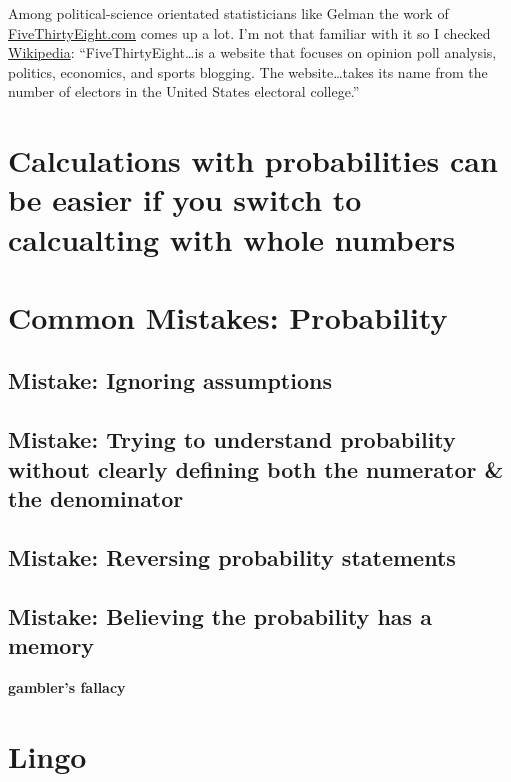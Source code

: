\documentclass[]{book}
\theoremstyle{definition}
\theoremstyle{definition}
\theoremstyle{definition}
\theoremstyle{remark}
\begin{document}
Among political-science orientated statisticians like Gelman the work of
\href{}{FiveThirtyEight.com} comes up a lot. I'm not that familiar with
it so I checked
\href{https://en.wikipedia.org/wiki/FiveThirtyEight}{Wikipedia}:
``FiveThirtyEight\ldots{}is a website that focuses on opinion poll
analysis, politics, economics, and sports blogging. The
website\ldots{}takes its name from the number of electors in the United
States electoral college.''

\section{Calculations with probabilities can be easier if you switch to
calcualting with whole
numbers}\label{calculations-with-probabilities-can-be-easier-if-you-switch-to-calcualting-with-whole-numbers}

\section{Common Mistakes:
Probability}\label{common-mistakes-probability}

\subsection{Mistake: Ignoring
assumptions}\label{mistake-ignoring-assumptions}

\subsection{Mistake: Trying to understand probability without clearly
defining both the numerator \& the
denominator}\label{mistake-trying-to-understand-probability-without-clearly-defining-both-the-numerator-the-denominator}

\subsection{Mistake: Reversing probability
statements}\label{mistake-reversing-probability-statements}

\subsection{Mistake: Believing the probability has a
memory}\label{mistake-believing-the-probability-has-a-memory}

\textbf{gambler's fallacy}

\section{Lingo}\label{lingo}
\end{document}
